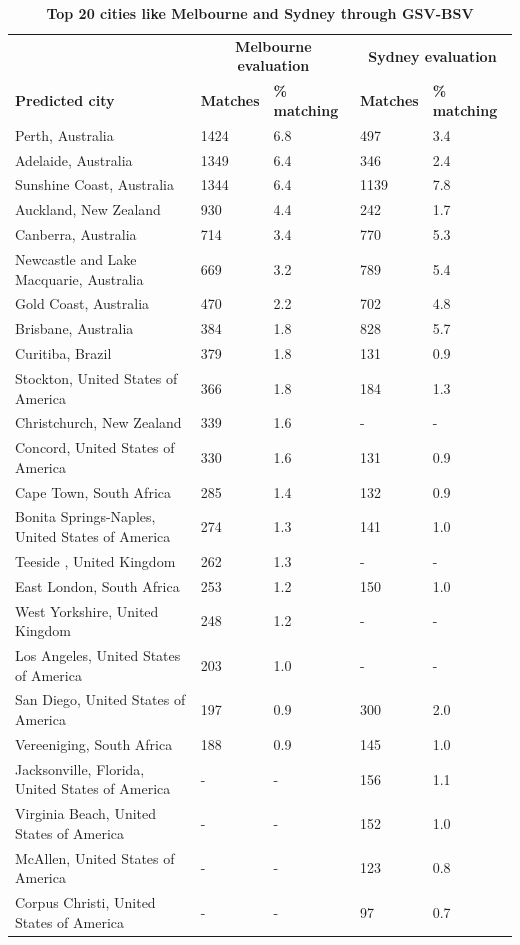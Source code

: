 \documentclass[Crown,sageh,times]{sagej}
\begin{document}
\begin{table}[!htbp]
\caption{\bf Top 20 cities like Melbourne and Sydney through GSV-BSV \label{tab:melbournesydneyGSV}}     
\begin{tabular}{ l  l l l  l}
 \hline    &  \multicolumn{2}{c}{\textbf{Melbourne evaluation}} & \multicolumn{2}{c}{\textbf{Sydney evaluation}}  \\  
\textbf{Predicted city} & \textbf{Matches} & \textbf{\% matching}  & \textbf{Matches} & \textbf{\% matching}\\ \hline
Perth, Australia & 1424 & 6.8 & 497 & 3.4 \\ 
Adelaide, Australia & 1349 & 6.4 & 346 & 2.4 \\ 
Sunshine Coast, Australia & 1344 & 6.4 & 1139 & 7.8 \\ 
Auckland, New Zealand & 930 & 4.4 & 242 & 1.7 \\ 
Canberra, Australia & 714 & 3.4 & 770 & 5.3 \\ 
Newcastle and Lake Macquarie, Australia & 669 & 3.2 & 789 & 5.4 \\ 
Gold Coast, Australia & 470 & 2.2 & 702 & 4.8 \\ 
Brisbane, Australia & 384 & 1.8 & 828 & 5.7 \\ 
Curitiba, Brazil & 379 & 1.8 & 131 & 0.9 \\ 
Stockton, United States of America & 366 & 1.8 & 184 & 1.3 \\ 
Christchurch, New Zealand & 339 & 1.6 &-&- \\ 
Concord, United States of America & 330 & 1.6 & 131 & 0.9 \\ 
Cape Town, South Africa & 285 & 1.4 & 132 & 0.9 \\ 
Bonita Springs-Naples, United States of America & 274 & 1.3 & 141 & 1.0 \\ 
Teeside , United Kingdom & 262 & 1.3 &-&- \\ 
East London, South Africa & 253 & 1.2 & 150 & 1.0 \\ 
West Yorkshire, United Kingdom & 248 & 1.2 &-&- \\ 
Los Angeles, United States of America & 203 & 1.0 &-&- \\ 
San Diego, United States of America & 197 & 0.9 & 300 & 2.0 \\ 
Vereeniging, South Africa & 188 & 0.9 & 145 & 1.0 \\ 
Jacksonville, Florida, United States of America  &-&- & 156 & 1.1\\ 
Virginia Beach, United States of America  &-&- & 152 & 1.0\\ 
McAllen, United States of America&-&- & 123 & 0.8\\ 
Corpus Christi, United States of America&-&- & 97 & 0.7\\ \hline
\end{tabular}
\end{table}
\end{document}
